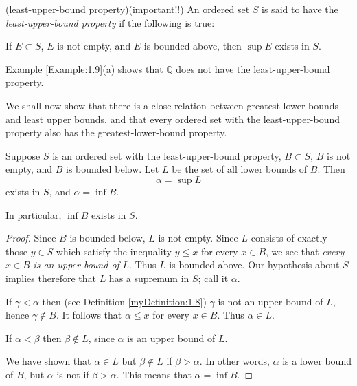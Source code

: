 \begin{myDefinition}(least-upper-bound property)(important!!)\label{myDefinitions:1.10}
An ordered set $S$ is said to have the \emph{least-upper-bound property}
if the following is true:

If $E \subset S$, $E$ is not empty, and $E$ is bounded above, then $\sup E$ exists in $S$.
\end{myDefinition}

Example \ref{Example:1.9}(a) shows that $\mathbb{Q}$ does not have the least-upper-bound property.

We shall now show that there is a close relation between greatest lower
bounds and least upper bounds, and that every ordered set with the least-upper-bound property also has the greatest-lower-bound property.

\begin{thm}\label{thm:1.11}
Suppose $S$ is an ordered set with the least-upper-bound property,
$B \subset S$, $B$ is not empty, and $B$ is bounded below. Let $L$ be the set of all lower
bounds of $B$. Then
\begin{equation*}
    \alpha = \sup L
\end{equation*}
exists in $S$, and $\alpha = \inf B$.

In particular, $\inf B$ exists in $S$.
\end{thm}

\begin{proof}
Since $B$ is bounded below, $L$ is not empty. Since $L$ consists of
exactly those $y \in S$ which satisfy the inequality $y \leq x$ for every $x \in B$, we
see that \emph{every} $x \in B$ \emph{is an upper bound of} $L$. Thus $L$ is bounded above.
Our hypothesis about $S$ implies therefore that $L$ has a supremum in $S$;
call it $\alpha$.

If $\gamma <\alpha$ then (see Definition \ref{myDefinition:1.8}) $\gamma$ is not an upper bound of $L$,
hence $\gamma \not\in B$. It follows that $\alpha \leq x$ for every $x \in B$. Thus $\alpha \in L$.

If $\alpha < \beta$ then $\beta \not\in L$, since $\alpha$ is an upper bound of $L$.

We have shown that $\alpha \in L$ but $\beta \not\in  L$ if $\beta>\alpha$. In other words, $\alpha$
is a lower bound of $B$, but $\alpha$ is not if $\beta > \alpha$. This means that $\alpha = \inf B$.
\end{proof}


